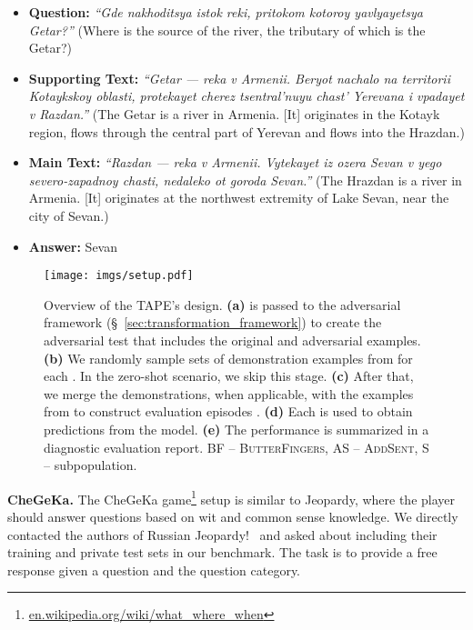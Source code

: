 \documentclass[11pt]{article}
\begin{document}
\begin{itemize}[noitemsep,leftmargin=1.em]
\item \textbf{Question:} \textit{``Gde nakhoditsya istok reki, pritokom kotoroy yavlyayetsya Getar?''} (Where is the source of the river, the tributary of which is the Getar?)
\item \textbf{Supporting Text:} \textit{``Getar — reka v Armenii. Beryot nachalo na territorii Kotaykskoy oblasti, protekayet cherez tsentral'nuyu chast' Yerevana i vpadayet v Razdan.''} (The Getar is a river in Armenia. [It] originates in the Kotayk region, flows through the central part of Yerevan and flows into the Hrazdan.)\item \textbf{Main Text:} \textit{``Razdan — reka v Armenii. Vytekayet iz ozera \colorbox{cb-salmon-pink}{Sevan} v yego severo-zapadnoy chasti, nedaleko ot goroda Sevan.''} (The Hrazdan is a river in Armenia. [It] originates at the northwest extremity of Lake Sevan, near the city of Sevan.) \item \textbf{Answer:} Sevan\end{itemize} 
\begin{figure*}[!ht]
\centering
\texttt{[image: imgs/setup.pdf]}
\caption{Overview of the TAPE's design. \textbf{(a)}  is passed to the adversarial framework (\S~\ref{sec:transformation_framework}) to create the adversarial test  that includes the original and adversarial examples. \textbf{(b)} We randomly sample  sets of demonstration examples from  for each . In the zero-shot scenario, we skip this stage. \textbf{(c)} After that, we merge the demonstrations, when applicable, with the examples from  to construct evaluation episodes . \textbf{(d)} Each  is used to obtain predictions from the model. \textbf{(e)} The performance is summarized in a diagnostic evaluation report. BF -- \textsc{ButterFingers}, AS -- \textsc{AddSent}, S -- subpopulation. }
\label{fig:eval_setup}
\end{figure*}
 
\noindent\textbf{CheGeKa.}
\label{chegeka}
The CheGeKa game\footnote{\href{https://en.wikipedia.org/wiki/What\%3F_Where\%3F_When\%3F}{en.wikipedia.org/wiki/what\_where\_when}} setup is similar to Jeopardy, where the player should answer questions based on wit and common sense knowledge. We directly contacted the authors of Russian Jeopardy!~\cite{https://doi.org/10.48550/arxiv.2112.02325} and asked about including their training and private test sets in our benchmark. The task is to provide a free response given a question and the question category. 
\end{document}
